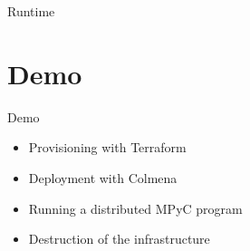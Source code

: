 \begin{frame}[fragile]{Runtime}
\protect\hypertarget{runtime}{}
\begin{Shaded}
\begin{Highlighting}[]

  
   
\end{Highlighting}
\end{Shaded}

\begin{Shaded}
\begin{Highlighting}[]





 \BuiltInTok{[}  \OtherTok{=}\BuiltInTok{]}

\OperatorTok{=}\DataTypeTok{\textbackslash{}}
\StringTok{ }\DataTypeTok{\textbackslash{}}
\StringTok{    }

 

\end{Highlighting}
\end{Shaded}
\end{frame}

\begin{frame}{}
\protect\hypertarget{section}{}
\section{Demo}
\end{frame}

\begin{frame}{Demo}
\protect\hypertarget{demo}{}
\begin{itemize}
\tightlist
\item
  Provisioning with Terraform
\item
  Deployment with Colmena
\item
  Running a distributed MPyC program
\item
  Destruction of the infrastructure
\end{itemize}
\end{frame}

